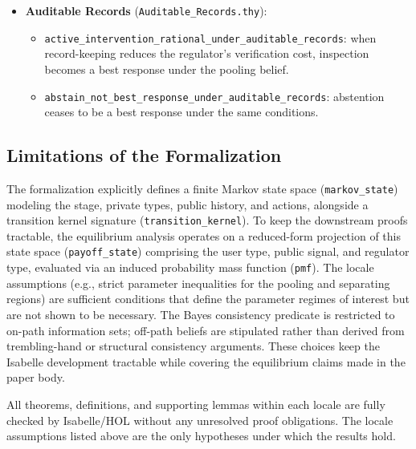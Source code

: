 \begin{itemize}
\begin{itemize}
      \end{itemize}
    \item \textbf{Auditable Records} (\texttt{Auditable\_Records.thy}):
      \begin{itemize}
        \item \texttt{active\_\allowbreak{}intervention\_\allowbreak{}rational\_\allowbreak{}under\_\allowbreak{}auditable\_\allowbreak{}records}: when record-keeping reduces the regulator's verification cost, inspection becomes a best response under the pooling belief.
        \item \texttt{abstain\_\allowbreak{}not\_\allowbreak{}best\_\allowbreak{}response\_\allowbreak{}under\_\allowbreak{}auditable\_\allowbreak{}records}: abstention ceases to be a best response under the same conditions.
      \end{itemize}
\end{itemize}

\subsection*{Limitations of the Formalization}

The formalization explicitly defines a finite Markov state space (\texttt{markov\_state}) modeling the stage, private types, public history, and actions, alongside a transition kernel signature (\texttt{transition\_kernel}). To keep the downstream proofs tractable, the equilibrium analysis operates on a reduced-form projection of this state space (\texttt{payoff\_state}) comprising the user type, public signal, and regulator type, evaluated via an induced probability mass function (\texttt{pmf}). The locale assumptions (e.g., strict parameter inequalities for the pooling and separating regions) are sufficient conditions that define the parameter regimes of interest but are not shown to be necessary. The Bayes consistency predicate is restricted to on-path information sets; off-path beliefs are stipulated rather than derived from trembling-hand or structural consistency arguments. These choices keep the Isabelle development tractable while covering the equilibrium claims made in the paper body.

All theorems, definitions, and supporting lemmas within each locale are fully checked by Isabelle/HOL without any unresolved proof obligations. The locale assumptions listed above are the only hypotheses under which the results hold.
